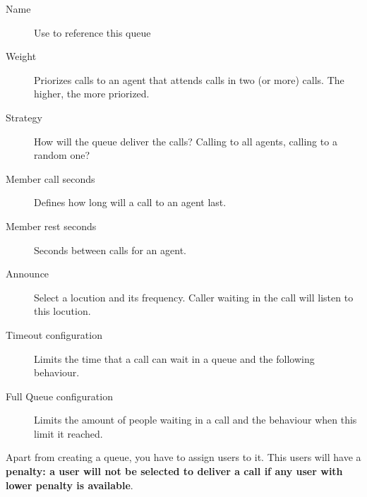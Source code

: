 \documentclass[letterpaper,10pt,english]{sphinxmanual}
\begin{document}
\begin{description}
\item[{Name}] \leavevmode{}\label{pbx_features/queues:term-name}
Use to reference this queue

\item[{Weight}] \leavevmode{}\label{pbx_features/queues:term-weight}
Priorizes calls to an agent that attends calls in two (or more) calls. The
higher, the more priorized.

\item[{Strategy}] \leavevmode{}\label{pbx_features/queues:term-strategy}
How will the queue deliver the calls? Calling to all agents, calling to a
random one?

\item[{Member call seconds}] \leavevmode{}\label{pbx_features/queues:term-member-call-seconds}
Defines how long will a call to an agent last.

\item[{Member rest seconds}] \leavevmode{}\label{pbx_features/queues:term-member-rest-seconds}
Seconds between calls for an agent.

\item[{Announce}] \leavevmode{}\label{pbx_features/queues:term-announce}
Select a locution and its frequency. Caller waiting in the call will listen
to this locution.

\item[{Timeout configuration}] \leavevmode{}\label{pbx_features/queues:term-timeout-configuration}
Limits the time that a call can wait in a queue and the following behaviour.

\item[{Full Queue configuration}] \leavevmode{}\label{pbx_features/queues:term-full-queue-configuration}
Limits the amount of people waiting in a call and the behaviour when this limit
it reached.

\end{description}

Apart from creating a queue, you have to assign users to it. This users will have
a \textbf{penalty: a user will not be selected to deliver a call if any user with lower
penalty is available}.
\end{document}
